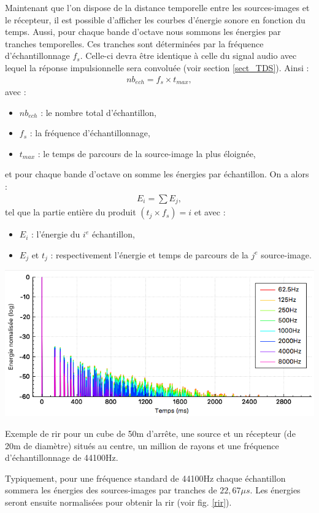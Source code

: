 Maintenant que l'on dispose de la distance temporelle entre les sources-images et le récepteur, il est possible d'afficher les courbes d'énergie sonore en fonction du temps. Aussi, pour chaque bande d'octave nous sommons les énergies par tranches temporelles. Ces tranches sont déterminées par la fréquence d'échantillonnage $f_s$. Celle-ci devra être identique à celle du signal audio avec lequel la réponse impulsionnelle sera convoluée (voir section \ref{sect_TDS}). Ainsi :
\begin{align}
nb_{ech} = f_s \times t_{max}, 
\end{align}
avec : 
\begin{itemize}
\item$nb_{ech}$ : le nombre total d'échantillon,
\item$f_s$ : la fréquence d'échantillonnage,
\item$t_{max}$ : le temps de parcours de la source-image la plus éloignée,
\end{itemize}
%
et pour chaque bande d'octave on somme les énergies par échantillon. On a alors : 
%
\begin{align}
E_{i} =  \sum{E_j},
\end{align}
tel que la partie entière du produit  $(t_j \times f_s) = i$
et avec : 
\begin{itemize}
\item$E_{i}$ : l'énergie du $i^e$ échantillon,
\item$E_j$ et $t_j$ : respectivement l'énergie et temps de parcours de la $j^e$ source-image.
\end{itemize}
%
 \begin{figureth}
	\includegraphics[width=0.9\linewidth]{images/rir}
	\caption[Réponse impulsionnelle d'un cube.]{Exemple de \gls{rir} pour un cube de 50m d'arrête, une source et un récepteur (de 20m de diamètre) situés au centre, un million de rayons et une fréquence d'échantillonnage de 44100Hz.}
	\label{rir}
\end{figureth}
%
Typiquement, pour une fréquence standard de 44100Hz chaque échantillon sommera les énergies des sources-images par tranches de $22,67\mu s$. Les énergies seront ensuite normalisées pour obtenir la \gls{rir} (voir fig. \ref{rir}).

